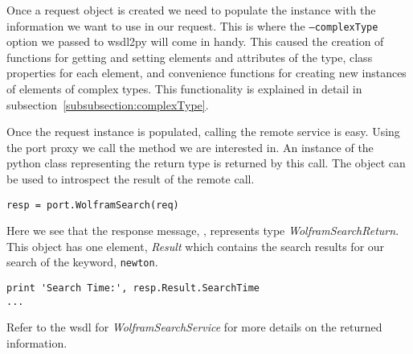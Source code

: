 Once a request object is created we need to populate the instance with the
information we want to use in our request.  This is where the {\tt --complexType}
option we passed to wsdl2py will come in handy.  This caused the creation of
functions for getting and setting elements and attributes of the type, class
properties for each element, and convenience functions for creating new instances
of elements of complex types.  This functionality is explained in detail in
subsection~\ref{subsubsection:complexType}.

Once the request instance is populated, calling the remote service is easy.  Using
the port proxy we call the method we are interested in.  An instance of the python
class representing the return type is returned by this call.  The  object
can be used to introspect the result of the remote call.

\begin{verbatim}
resp = port.WolframSearch(req)
\end{verbatim}

Here we see that the response message, , represents type {\it WolframSearchReturn}.
This object has one element, {\it Result} which contains the search results for our
search of the keyword, {\tt newton}.

\begin{verbatim}
print 'Search Time:', resp.Result.SearchTime
...
\end{verbatim}

Refer to the wsdl for {\it WolframSearchService} for more details on the
returned information.
